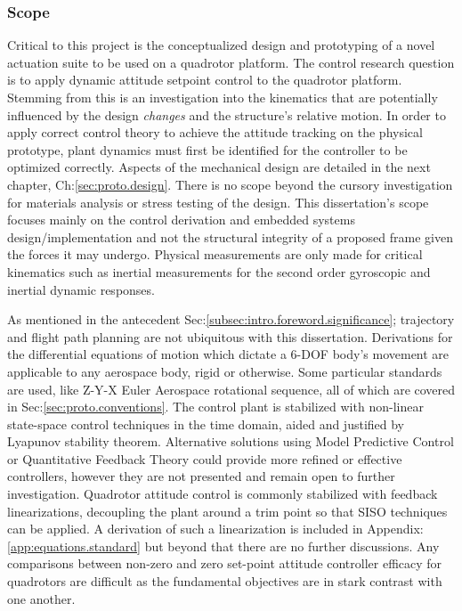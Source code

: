 \subsubsection{Scope}
\label{subsubsec:intro.foreword.scope}
Critical to this project is the conceptualized design and prototyping of a novel actuation suite to be used on a quadrotor platform. The control research question is to apply dynamic attitude setpoint control to the quadrotor platform. Stemming from this is an investigation into the kinematics that are potentially influenced by the design \emph{changes} and the structure's relative motion. In order to apply correct control theory to achieve the attitude tracking on the physical prototype, plant dynamics must first be identified for the controller to be optimized correctly. Aspects of the mechanical design are detailed in the next chapter, Ch:\ref{sec:proto.design}. There is no scope beyond the cursory investigation for materials analysis or stress testing of the design. This dissertation's scope focuses mainly on the control derivation and embedded systems design/implementation and not the structural integrity of a proposed frame given the forces it may undergo. Physical measurements are only made for critical kinematics such as inertial measurements for the second order gyroscopic and inertial dynamic responses.
\par
As mentioned in the antecedent Sec:\ref{subsec:intro.foreword.significance}; trajectory and flight path planning are not ubiquitous with this dissertation. Derivations for the differential equations of motion which dictate a 6-DOF body's movement are applicable to any aerospace body, rigid or otherwise. Some particular standards are used, like Z-Y-X Euler Aerospace rotational sequence, all of which are covered in Sec:\ref{sec:proto.conventions}. The control plant is stabilized with non-linear state-space control techniques in the time domain, aided and justified by Lyapunov stability theorem\cite{noteonlyapunov,nonlinearsystems}. Alternative solutions using Model Predictive Control or Quantitative Feedback Theory could provide more refined or effective controllers, however they are not presented and remain open to further investigation. Quadrotor attitude control is commonly stabilized with feedback linearizations, decoupling the plant around a trim point so that SISO techniques can be applied. A derivation of such a linearization is included in Appendix:\ref{app:equations.standard} but beyond that there are no further discussions. Any comparisons between non-zero and zero set-point attitude controller efficacy for quadrotors are difficult as the fundamental objectives are in stark contrast with one another.
